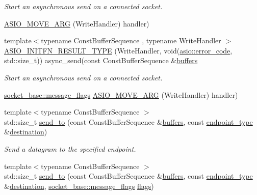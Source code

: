 \begin{DoxyCompactItemize}
\begin{DoxyCompactList}\small\item\em Start an asynchronous send on a connected socket. \end{DoxyCompactList}\item 
\hyperlink{classasio_1_1basic__datagram__socket_adcf43541d315dc64c200d4d6f486e3b0}{A\+S\+I\+O\+\_\+\+M\+O\+V\+E\+\_\+\+A\+R\+G} (Write\+Handler) handler)
\item 
{\footnotesize template$<$typename Const\+Buffer\+Sequence , typename Write\+Handler $>$ }\\\hyperlink{classasio_1_1basic__datagram__socket_aedcc367a0e25bdb0ea80ee2f1545290a}{A\+S\+I\+O\+\_\+\+I\+N\+I\+T\+F\+N\+\_\+\+R\+E\+S\+U\+L\+T\+\_\+\+T\+Y\+P\+E} (Write\+Handler, void(\hyperlink{classasio_1_1error__code}{asio\+::error\+\_\+code}, std\+::size\+\_\+t)) async\+\_\+send(const Const\+Buffer\+Sequence \&\hyperlink{group__async__read_ga54dede45c3175148a77fe6635222c47d}{buffers}
\begin{DoxyCompactList}\small\item\em Start an asynchronous send on a connected socket. \end{DoxyCompactList}\item 
\hyperlink{classasio_1_1socket__base_ac3cf77465dfedfe1979b5415cf32cc94}{socket\+\_\+base\+::message\+\_\+flags} \hyperlink{classasio_1_1basic__datagram__socket_aff4ad8ef7131d74855a3fe3374997906}{A\+S\+I\+O\+\_\+\+M\+O\+V\+E\+\_\+\+A\+R\+G} (Write\+Handler) handler)
\item 
{\footnotesize template$<$typename Const\+Buffer\+Sequence $>$ }\\std\+::size\+\_\+t \hyperlink{classasio_1_1basic__datagram__socket_adc259a0202626967fa5619449c081b38}{send\+\_\+to} (const Const\+Buffer\+Sequence \&\hyperlink{group__async__read_ga54dede45c3175148a77fe6635222c47d}{buffers}, const \hyperlink{classasio_1_1basic__datagram__socket_af952c8d18c85588a16531cfc54a172bb}{endpoint\+\_\+type} \&\hyperlink{classasio_1_1basic__datagram__socket_a63941967078c45fcc3c315ee150070fb}{destination})
\begin{DoxyCompactList}\small\item\em Send a datagram to the specified endpoint. \end{DoxyCompactList}\item 
{\footnotesize template$<$typename Const\+Buffer\+Sequence $>$ }\\std\+::size\+\_\+t \hyperlink{classasio_1_1basic__datagram__socket_a01977a874ce184dbfd6c448db8af9f58}{send\+\_\+to} (const Const\+Buffer\+Sequence \&\hyperlink{group__async__read_ga54dede45c3175148a77fe6635222c47d}{buffers}, const \hyperlink{classasio_1_1basic__datagram__socket_af952c8d18c85588a16531cfc54a172bb}{endpoint\+\_\+type} \&\hyperlink{classasio_1_1basic__datagram__socket_a63941967078c45fcc3c315ee150070fb}{destination}, \hyperlink{classasio_1_1socket__base_ac3cf77465dfedfe1979b5415cf32cc94}{socket\+\_\+base\+::message\+\_\+flags} \hyperlink{classasio_1_1basic__datagram__socket_a787b917059f9c50a483196d3edaf800c}{flags})

\end{DoxyCompactItemize}

